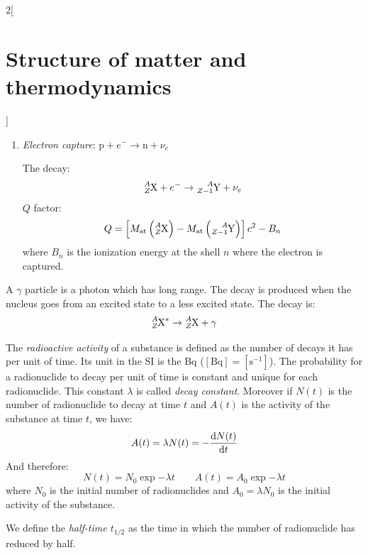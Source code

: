 \documentclass[../../../main.tex]{subfiles}
\begin{document}
\begin{multicols}{2}[\section{Structure of matter and thermodynamics}]
\begin{definition}
\begin{enumerate}
            \item \textit{Electron capture}: $\text{p}+e^-\rightarrow\text{n}+\nu_e$\par
                  The decay: $$\ce{^$A$_$Z$X}+e^-\rightarrow\ce{^$A$_$Z-1$Y}+\nu_e$$
                  $Q$ factor: $$Q=\left[M_\text{at}\left(\ce{^$A$_$Z$X}\right)-M_\text{at}\left(\ce{^$A$_$Z-1$Y}\right)\right]c^2-B_n$$
                  where $B_n$ is the ionization energy at the shell $n$ where the electron is captured.
        \end{enumerate}
    \end{definition}
    \begin{definition}
        A $\gamma$ particle is a photon which has long range. The decay is produced when the nucleus goes from an excited state to a less excited state. The decay is: $$\ce{^$A$_$Z$X}^*\rightarrow\ce{^$A$_$Z$X}+\gamma$$
    \end{definition}
    \begin{definition}
        The \textit{radioactive activity} of a substance is defined as the number of decays it has per unit of time. Its unit in the SI is the Bq ($[\text{Bq}]=[\text{s}^{-1}]$). The probability for a radionuclide to decay per unit of time is constant and unique for each radionuclide. This constant $\lambda$ is called \textit{decay constant}. Moreover if $N(t)$ is the number of radionuclide to decay at time $t$ and $A(t)$ is the activity of the substance at time $t$, we have:
        $$A(t)=\lambda N(t)=-\dv{N(t)}{t}$$ And therefore:
        $$N(t)=N_0\exp{-\lambda t}\qquad A(t)=A_0\exp{-\lambda t}$$
        where $N_0$ is the initial number of radionuclides and $A_0=\lambda N_0$ is the initial activity of the substance.
    \end{definition}
    \begin{definition}
        We define the \textit{half-time $t_{1/2}$} as the time in which the number of radionuclide has reduced by half.
    \end{definition}
    \begin{center}
        \begin{minipage}{\linewidth}
            \centering
            
        \end{minipage}
    \end{center}

\end{multicols}
\end{document}
